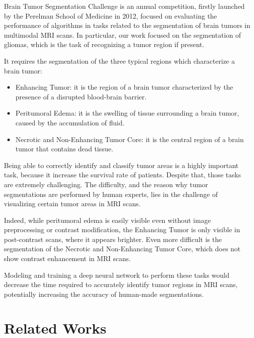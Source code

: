 \documentclass[10pt,twocolumn,letterpaper]{article}
\begin{document}
Brain Tumor Segmentation Challenge is an annual competition, firstly launched by the Perelman School of Medicine\cite{BraTSChallenge} in 2012, focused on evaluating the performance of algorithms in tasks related to the segmentation of brain tumors in multimodal MRI scans. In particular, our work focused on the segmentation of gliomas, which is the task of recognizing a tumor region if present.

It requires the segmentation of the three typical regions which characterize a brain tumor:
    \begin{itemize}
        \item Enhancing Tumor: it is the region of a brain tumor characterized by the presence of a disrupted blood-brain barrier.
        \item Peritumoral Edema: it is the swelling of tissue surrounding a brain tumor, caused by the accumulation of fluid.
        \item Necrotic and Non-Enhancing Tumor Core: it is the central region of a brain tumor that contains dead tissue.
\end{itemize}

Being able to correctly identify and classify tumor areas is a highly important task, because it increase the survival rate of patients. Despite that, those tasks are extremely challenging. The difficulty, and the reason why tumor segmentations are performed by human experts, lies in the challenge of visualizing certain tumor areas in MRI scans.

Indeed, while peritumoral edema is easily visible even without image preprocessing or contrast modification, the Enhancing Tumor is only visible in post-contrast scans, where it appears brighter. Even more difficult is the segmentation of the Necrotic and Non-Enhancing Tumor Core, which does not show contrast enhancement in MRI scans.

Modeling and training a deep neural network to perform these tasks would decrease the time required to accurately identify tumor regions in MRI scans, potentially increasing the accuracy of human-made segmentations.

\section{Related Works}
\end{document}
